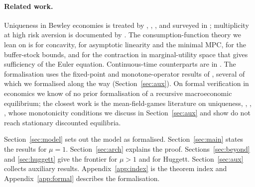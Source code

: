 \paragraph{Related work.}
Uniqueness in Bewley economies is treated by \citet{Acikgoz2018}, \citet{Light2020},
\citet{Light2022}, and surveyed in \citet{TodaWalsh2024}; multiplicity at high risk aversion is
documented by \citet{YoungWalsh2025}. The consumption-function theory we lean on is
\citet{CarrollKimball1996} for concavity, \citet{MaToda2022} for asymptotic linearity and the
minimal MPC, \citet{CarrollShanker2026} for the buffer-stock bounds, and \citet{LiStachurski2014}
for the contraction in marginal-utility space that gives sufficiency of the Euler equation.
Continuous-time counterparts are in \citet{AchdouEtAl2022}. The formalisation uses the fixed-point
and monotone-operator results of \citet{SargentStachurski2024}, several of which we formalised
along the way (Section~\ref{sec:aux}). On formal verification in economics we know of no prior
formalisation of a recursive macroeconomic equilibrium; the closest work is the mean-field-games
literature on uniqueness, \citet{LasryLions2007}, \citet{GraberMatter2024},
\citet{CannarsaCapuani2018}, whose monotonicity conditions we discuss in Section~\ref{sec:aux}
and show do not reach stationary discounted equilibria.

Section~\ref{sec:model} sets out the model as formalised. Section~\ref{sec:main} states the
results for $\mu=1$. Section~\ref{sec:arch} explains the proof. Sections~\ref{sec:beyond} and
\ref{sec:huggett} give the frontier for $\mu>1$ and for Huggett. Section~\ref{sec:aux} collects
auxiliary results. Appendix~\ref{app:index} is the theorem index and Appendix~\ref{app:formal}
describes the formalisation.
